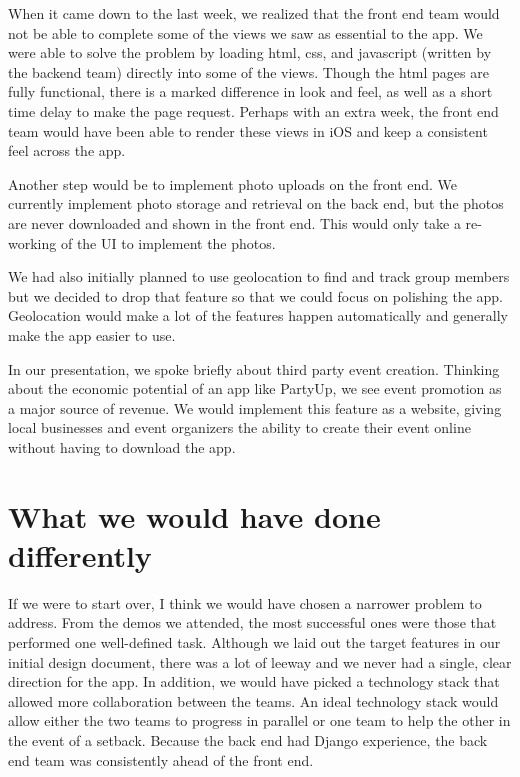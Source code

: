 \documentclass[12pt]{article}
\begin{document}
When it came down to the last week, we realized that the front end team would not be able to complete some of the views we saw as essential to the app. 
We were able to solve the problem by loading html, css, and javascript (written by the backend team) directly into some of the views. 
Though the html pages are fully functional, there is a marked difference in look and feel, as well as a short time delay to make the page request. 
Perhaps with an extra week, the front end team would have been able to render these views in iOS and keep a consistent feel across the app. 

\bigskip

Another step would be to implement photo uploads on the front end.
We currently implement photo storage and retrieval on the back end, but the photos are never downloaded and shown in the front end.
This would only take a re-working of the UI to implement the photos.

\bigskip

We had also initially planned to use geolocation to find and track group members but we decided to drop that feature so that we could focus on polishing the app. 
Geolocation would make a lot of the features happen automatically and generally make the app easier to use. 

\bigskip

In our presentation, we spoke briefly about third party event creation. 
Thinking about the economic potential of an app like PartyUp, we see event promotion as a major source of revenue. 
We would implement this feature as a website, giving local businesses and event organizers the ability to create their event online without having to download the app.

\bigskip

\section{What we would have done differently}

If we were to start over, I think we would have chosen a narrower problem to address. 
From the demos we attended, the most successful ones were those that performed one well-defined task. 
Although we laid out the target features in our initial design document, there was a lot of leeway and we never had a single, clear direction for the app. 
In addition, we would have picked a technology stack that allowed more collaboration between the teams.
An ideal technology stack would allow either the two teams to progress in parallel or one team to help the other in the event of a setback. 
Because the back end had Django experience, the back end team was consistently ahead of the front end.
\end{document}
